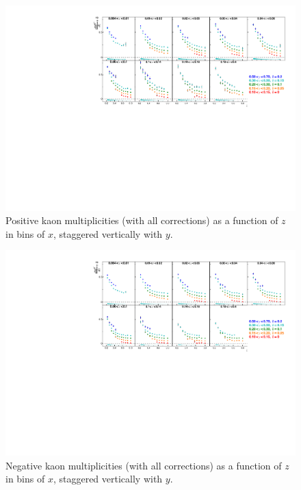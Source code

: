 \begin{figure}[!h]
  \centering
	\includegraphics[scale=0.85]{./gfx/Kp.pdf}
	\caption{Positive kaon multiplicities (with all corrections) as a function of $z$ in bins of $x$, staggered vertically with $y$.}
	\label{pic:mkp}
\end{figure}

\newpage

\begin{figure}[!h]
  \centering
	\includegraphics[scale=0.85]{./gfx/Km.pdf}
	\caption{Negative kaon multiplicities (with all corrections) as a function of $z$ in bins of $x$, staggered vertically with $y$.}
	\label{pic:mkm}
\end{figure}

